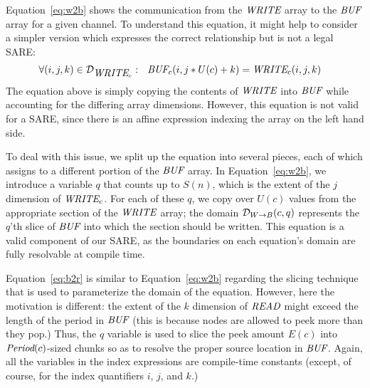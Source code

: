 Equation~\ref{eq:w2b} shows the communication from the $\mbox{\it WRITE}$
array to the $\mbox{\it BUF}$ array for a given channel.  To understand this
equation, it might help to consider a simpler version which expresses
the correct relationship but is not a legal SARE:
\begin{align*}
&\forall (i,j,k) \in {\cal D}_{\mbox{\it WRITE}_c}:~~
\mbox{\it BUF}_{c}(i,j*U(c)+k) = \mbox{\it WRITE}_{c}(i, j, k)
\end{align*}
The equation above is simply copying the contents of $\mbox{\it WRITE}$ into
$\mbox{\it BUF}$ while accounting for the differing array dimensions.
However, this equation is not valid for a SARE, since there is an
affine expression indexing the array on the left hand side.

To deal with this issue, we split up the equation into several pieces,
each of which assigns to a different portion of the $\mbox{\it BUF}$ array.
In Equation~\ref{eq:w2b}, we introduce a variable $q$ that counts up
to $S(n)$, which is the extent of the $j$ dimension of $\mbox{\it WRITE}_c$.
For each of these $q$, we copy over $U(c)$ values from the appropriate
section of the $\mbox{\it WRITE}$ array; the domain ${\cal D}_{W \rightarrow
B}(c,q)$ represents the $q$'th slice of $\mbox{\it BUF}$ into which the
section should be written.  This equation is a valid component of our
SARE, as the boundaries on each equation's domain are fully resolvable
at compile time.

\clearpage
Equation~\ref{eq:b2r} is similar to Equation~\ref{eq:w2b} regarding
the slicing technique that is used to parameterize the domain of the
equation.  However, here the motivation is different: the extent of
the $k$ dimension of $\mbox{\it READ}$ might exceed the length of the period
in $\mbox{\it BUF}$ (this is because nodes are allowed to peek more than
they pop.)  Thus, the $q$ variable is used to slice the peek amount
$E(c)$ into $\mbox{\it Period}(c)$-sized chunks so as to resolve the proper
source location in $\mbox{\it BUF}$.  Again, all the variables in the index
expressions are compile-time constants (except, of course, for the
index quantifiers $i$, $j$, and $k$.)
